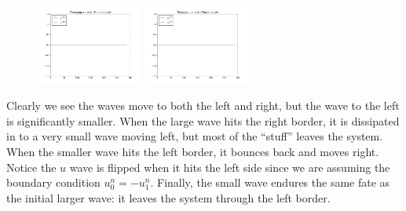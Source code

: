 \documentclass{article} %
\theoremstyle{plain}
\numberwithin{equation}{section} %
\numberwithin{figure}{section} %
\numberwithin{table}{section} %
\begin{document}
\begin{enumerate}[\ \ (a)]
\begin{figure}[ht!]
            \includegraphics[width=0.31\textwidth]{figures/problem_1_a_104.png}
            \includegraphics[width=0.31\textwidth]{figures/problem_1_a_111.png}
        \end{figure}
        \FloatBarrier
        Clearly we see the waves move to both the left and right, but the wave to the left is significantly smaller.  When the large wave hits the right border, it is dissipated in to a very small wave moving left, but most of the ``stuff'' leaves the system.  When the smaller wave hits the left border, it bounces back and moves right.  Notice the $u$ wave is flipped when it hits the left side since we are assuming the boundary condition $u_0^n = -u_1^n$.  Finally, the small wave endures the same fate as the initial larger wave: it leaves the system through the left border. \\


\end{enumerate}
\end{document}
